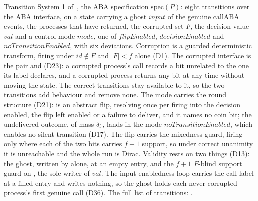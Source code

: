 \begin{definition}
  \label{def:aba-spec}
  \leanok
  Transition System 1 of~\cite{LeslieBP}, the ABA specification $\mathrm{spec}(P)$: eight transitions over the ABA interface, on a state carrying a ghost $input$ of the genuine $\mathrm{callABA}$ events, the processes that have returned, the corrupted set $F$, the decision value $val$ and a control mode $mode$, one of $flipEnabled$, $decisionEnabled$ and $noTransitionEnabled$, with six deviations.
  Corruption is a guarded deterministic transform,  firing under $id \notin F$ and $|F| < f$ alone (D1).
  The corrupted interface is the pair  and  (D23): a corrupted process's call records a bit unrelated to the one its label declares, and a corrupted process returns any bit at any time without moving the state.
  The correct transitions stay available to it, so the two transitions add behaviour and remove none.
  The mode carries the round structure (D21):  is an abstract flip, resolving once per firing into the decision enabled, the flip left enabled or a failure to deliver, and it names no coin bit; the undelivered outcome, of mass $\delta_{\mathrm{f}}$, lands in the mode $noTransitionEnabled$, which enables no silent transition (D17).
  The flip carries the mixedness guard, firing only where each of the two bits carries $f{+}1$ support, so under correct unanimity it is unreachable and the whole run is Dirac.
  Validity rests on two things (D13): the ghost, written by  alone, at an empty entry, and the $f{+}1$ $F$-blind support guard  on , the sole writer of $val$.
  The input-enabledness loop  carries the call label at a filled entry and writes nothing, so the ghost holds each never-corrupted process's first genuine call (D36).
  The full list of transitions: .
\end{definition}
